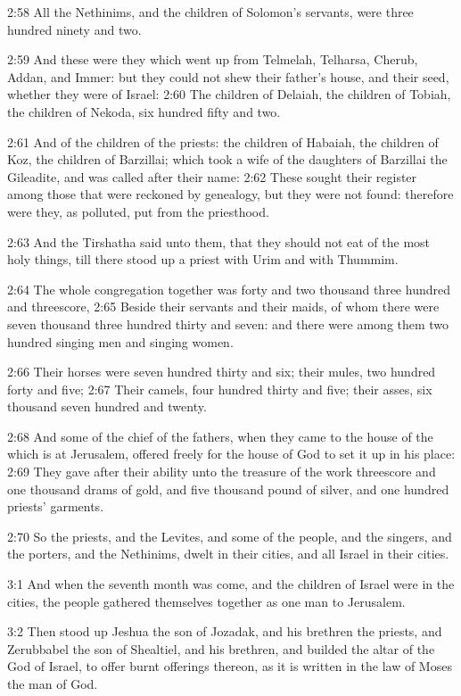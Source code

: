 2:58 All the Nethinims, and the children of Solomon's servants, were
three hundred ninety and two.

2:59 And these were they which went up from Telmelah, Telharsa,
Cherub, Addan, and Immer: but they could not shew their father's
house, and their seed, whether they were of Israel: 2:60 The children
of Delaiah, the children of Tobiah, the children of Nekoda, six
hundred fifty and two.

2:61 And of the children of the priests: the children of Habaiah, the
children of Koz, the children of Barzillai; which took a wife of the
daughters of Barzillai the Gileadite, and was called after their name:
2:62 These sought their register among those that were reckoned by
genealogy, but they were not found: therefore were they, as polluted,
put from the priesthood.

2:63 And the Tirshatha said unto them, that they should not eat of the
most holy things, till there stood up a priest with Urim and with
Thummim.

2:64 The whole congregation together was forty and two thousand three
hundred and threescore, 2:65 Beside their servants and their maids, of
whom there were seven thousand three hundred thirty and seven: and
there were among them two hundred singing men and singing women.

2:66 Their horses were seven hundred thirty and six; their mules, two
hundred forty and five; 2:67 Their camels, four hundred thirty and
five; their asses, six thousand seven hundred and twenty.

2:68 And some of the chief of the fathers, when they came to the house
of the \LORD which is at Jerusalem, offered freely for the house of God
to set it up in his place: 2:69 They gave after their ability unto the
treasure of the work threescore and one thousand drams of gold, and
five thousand pound of silver, and one hundred priests' garments.

2:70 So the priests, and the Levites, and some of the people, and the
singers, and the porters, and the Nethinims, dwelt in their cities,
and all Israel in their cities.

3:1 And when the seventh month was come, and the children of Israel
were in the cities, the people gathered themselves together as one man
to Jerusalem.

3:2 Then stood up Jeshua the son of Jozadak, and his brethren the
priests, and Zerubbabel the son of Shealtiel, and his brethren, and
builded the altar of the God of Israel, to offer burnt offerings
thereon, as it is written in the law of Moses the man of God.

